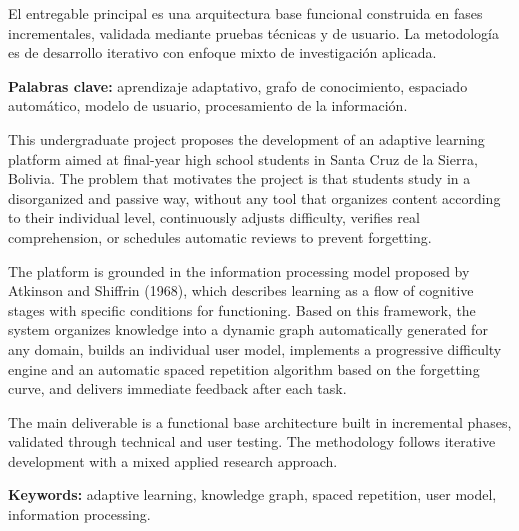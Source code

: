 El entregable principal es una arquitectura base funcional construida en fases incrementales, validada mediante pruebas técnicas y de usuario. La metodología es de desarrollo iterativo con enfoque mixto de investigación aplicada.

\textbf{Palabras clave:} aprendizaje adaptativo, grafo de conocimiento, espaciado automático, modelo de usuario, procesamiento de la información.


This undergraduate project proposes the development of an adaptive learning platform aimed at final-year high school students in Santa Cruz de la Sierra, Bolivia. The problem that motivates the project is that students study in a disorganized and passive way, without any tool that organizes content according to their individual level, continuously adjusts difficulty, verifies real comprehension, or schedules automatic reviews to prevent forgetting.

The platform is grounded in the information processing model proposed by Atkinson and Shiffrin (1968), which describes learning as a flow of cognitive stages with specific conditions for functioning. Based on this framework, the system organizes knowledge into a dynamic graph automatically generated for any domain, builds an individual user model, implements a progressive difficulty engine and an automatic spaced repetition algorithm based on the forgetting curve, and delivers immediate feedback after each task.

The main deliverable is a functional base architecture built in incremental phases, validated through technical and user testing. The methodology follows iterative development with a mixed applied research approach.

\textbf{Keywords:} adaptive learning, knowledge graph, spaced repetition, user model, information processing.
